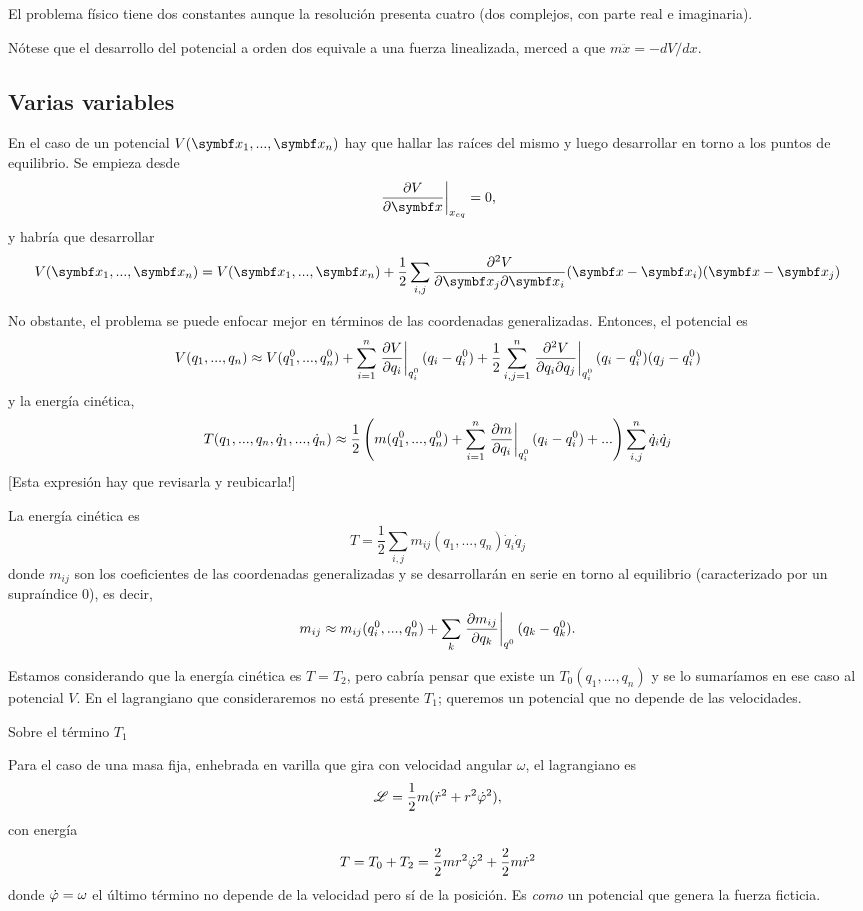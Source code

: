 \documentclass[10pt,oneside]{CBFT_book}
\begin{document}
El problema físico tiene dos constantes aunque la resolución presenta cuatro (dos complejos, con parte real e imaginaria).

Nótese que el desarrollo del potencial a orden dos equivale a una fuerza linealizada, merced a que $ m \ddot{x} = - dV/dx$.

\subsection{Varias variables}

En el caso de un potencial $V(\vb{x}_1, ...,\vb{x}_n)$ hay que hallar las raíces del mismo y luego desarrollar en torno a los puntos
de equilibrio. Se empieza desde 
\[
	\dpare{V}{\vb{x}}{x_{eq}} = 0,
\]
y habría que desarrollar 
\[
	V( \vb{x}_1, ...,\vb{x}_n ) = V( \vb{x}_1, ...,\vb{x}_n ) + 
	\frac 1 2 \sum_{i,j} \dparcru{V}{\vb{x}_i}{\vb{x}_j}(\vb{x}-\vb{x}_i)(\vb{x}-\vb{x}_j)
\]

No obstante, el problema se puede enfocar mejor en términos de las coordenadas generalizadas. Entonces, el potencial es
\[
	V(q_1,...,q_n) \approx V(q_1^0,...,q_n^0) + \sum_{i=1}^n \left. \dpar{V}{q_i} \right|_{q_i^0} (q_i - q_i^0)
		+ \frac{1}{2} \sum_{i,j=1}^n \left. \dparcru{V}{q_j}{q_i}\right|_{q_i^0}(q_i -q_i^0)(q_j -q_i^0)
\]
y la energía cinética,
\[
	T(q_1,...,q_n,\dot{q}_1,...,\dot{q}_n) \approx \frac{1}{2} \left( m(q_1^0,...,q_n^0) + \sum_{i=1}^n 
				\left. \dpar{m}{q_i} \right|_{q_i^0} (q_i - q_i^0) + ... \right) \sum_{i,j}^n \dot{q}_i\dot{q}_j
\]
[Esta expresión hay que revisarla y reubicarla!]

La energía cinética es 
\[
	T = \frac 1 2 \sum_{i,j} m_{ij}(q_1,...,q_n) \dot{q}_i \dot{q}_j
\]
donde $m_{ij}$ son los coeficientes de las coordenadas generalizadas y se desarrollarán en serie en torno al equilibrio (caracterizado
por un supraíndice $0$), es decir,
\[
	m_{ij} \approx m_{ij}( q_i^0, ..., q_n^0 ) + \sum_k \dpare{ m_{ij} }{ q_k }{q^0}( q_k - q_k^0 ).
\]

Estamos considerando que la energía cinética es $ T = T_2 $, pero cabría pensar que existe un $ T_0( q_1,...,q_n)$ y se lo 
sumaríamos en ese caso al potencial $V$. En el lagrangiano que consideraremos no está presente $T_1$; queremos un potencial
que no depende de las velocidades.

\begin{ejemplo}{Sobre el término $T_1$}

Para el caso de una masa fija, enhebrada en varilla que gira con velocidad angular $\omega$, el lagrangiano es
\[
	\Lag = \frac 1 2 m (\dot{r}^2 + r^2 \dot{\vp}^2),
\]
con energía
\[
	T = T_0 + T_2 = \frac{2}{2}mr^2\dot{\vp}^2 + \frac{2}{2}m\dot{r}^2
\]
donde $\dot{\vp} = \omega$ el último término no depende de la velocidad pero sí de la posición.
Es {\it como} un potencial que genera la fuerza ficticia.
\end{ejemplo}
\end{document}
